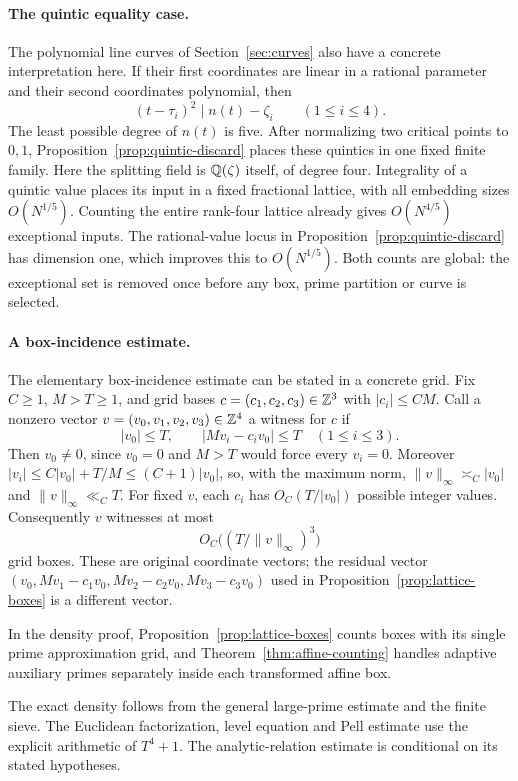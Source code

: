 \paragraph{The quintic equality case.}
The polynomial line curves of Section~\ref{sec:curves} also have a
concrete interpretation here.
If their first coordinates are linear in a rational parameter and
their second coordinates polynomial, then
\[
 (t-\tau_i)^2\mid n(t)-\zeta_i\qquad(1\le i\le4).
\]
The least possible degree of $n(t)$ is five. After normalizing two
critical points to $0,1$, Proposition~\ref{prop:quintic-discard}
places these quintics in one fixed finite family. Here the splitting
field is $\mathbb Q(\zeta)$ itself, of degree four. Integrality of a quintic
value places its input in a fixed fractional lattice, with all
embedding sizes $O(N^{1/5})$. Counting the entire rank-four lattice
already gives $O(N^{4/5})$ exceptional inputs. The rational-value
locus in Proposition~\ref{prop:quintic-discard} has dimension one,
which improves this to $O(N^{1/5})$. Both counts are global: the
exceptional set is removed once before any box, prime partition or
curve is selected.

\paragraph{A box-incidence estimate.}
The elementary box-incidence estimate can be stated in a concrete grid.
Fix $C\ge1$, $M>T\ge1$, and grid bases
$c=(c_1,c_2,c_3)\in\mathbb Z^3$ with $|c_i|\le CM$. Call a nonzero vector
$v=(v_0,v_1,v_2,v_3)\in\mathbb Z^4$ a witness for $c$ if
\[
 |v_0|\le T,\qquad |Mv_i-c_i v_0|\le T\quad(1\le i\le3).
\]
Then $v_0\ne0$, since $v_0=0$ and $M>T$ would force every $v_i=0$.
Moreover $|v_i|\le C|v_0|+T/M\le(C+1)|v_0|$, so, with the maximum
norm, $\|v\|_\infty\asymp_C|v_0|$ and $\|v\|_\infty\ll_C T$.
For fixed $v$, each $c_i$ has $O_C(T/|v_0|)$ possible integer values.
Consequently $v$ witnesses at most
\[
 O_C\bigl((T/\|v\|_\infty)^3\bigr)
\]
grid boxes. These are original coordinate vectors; the residual vector
$(v_0,Mv_1-c_1v_0,Mv_2-c_2v_0,Mv_3-c_3v_0)$ used in
Proposition~\ref{prop:lattice-boxes} is a different vector.

In the density proof,
Proposition~\ref{prop:lattice-boxes} counts boxes with its single prime
approximation grid, and Theorem~\ref{thm:affine-counting} handles adaptive
auxiliary primes separately inside each transformed affine box.

The exact density follows from the general large-prime estimate and
the finite sieve. The Euclidean factorization, level equation and Pell
estimate use the explicit arithmetic of $T^4+1$. The analytic-relation
estimate is conditional on its stated hypotheses.
